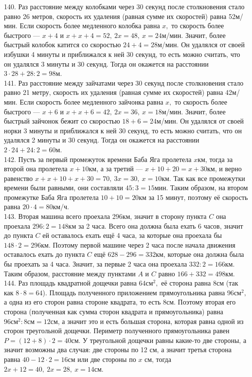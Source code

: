 \documentclass[12pt]{article}
\begin{document}
140. Раз расстояние между колобками через 30 секунд после столкновения стало равно 26 метров, скорость их удаления (равная сумме их скоростей) равна 52м/мин. Если скорость более медленного колобка равна $x,$ то скорость более быстрого --- $x+4$ и $x+x+4=52,\ 2x=48,\ x=24$м/мин. Значит, более быстрый колобок катится со скоростью $24+4=28$м/мин. Он удалялся от своей избушки 4 минуты и приближался к ней 30 секунд, то есть можно считать, что он удалялся 3 минуты и 30 секунд. Тогда он окажется на расстоянии $3\cdot28+28:2=98$м.\\
141. Раз расстояние между зайчатами через 30 секунд после столкновения стало равно 21 метру, скорость их удаления (равная сумме их скоростей) равна 42м/мин. Если скорость более медленного зайчонка равна $x,$ то скорость более быстрого --- $x+6$ и $x+x+6=42,\ 2x=36,\ x=18$м/мин. Значит, более быстрый зайчонок бежит со скоростью $18+6=24$м/мин. Он удалялся от своей норки 3 минуты и приближался к ней 30 секунд, то есть можно считать, что он удалялся 2 минуты и 30 секунд. Тогда он окажется на расстоянии $2\cdot24+24:2=60$м.\\
142. Пусть за первый промежуток времени Баба Яга пролетела $x$км, тогда за второй она пролетела $x+10$км, а за третий --- $x+10+20=x+30$км, и верно равенство $x+x+10+x+30=70,\ 3x=30,\ x=10$км. Так как все промежутки времени были равными, они составляли $45:3=15$мин. Таким образом, на втором промежутке Баба Яга пролетела $10+10=20$км за 15 минут, поэтому её скорость равна $20\cdot4=80$км/ч.\\
143. Вторая машина всего проехала 296км, значит в сторону пункта $C$ она проехала $296:2=148$км за 2 часа. Всего она должна была ехать 6 часов, значит до пункта $C$ ей оставалось ехать ещё 4 часа, за которые она проехала бы $148\cdot2=296$км. Поэтому первой машине через 2 часа после начала движения оставалось ехать до пункта $C$ ещё $628-296=332$км, которые она должна была бы проехать за 4 часа. Значит, за первые 2 часа она проехала $332:2=166$км. Таким образом, расстояние между пунктами $A$ и $C$ равно $166+332=498$км.\\
144. Раз площадь квадратной дощечки равна $64\text{см}^2,$ её сторона равна 8см (так как $8\cdot8=64$). Площадь полученного приложением прямоугольника равна $96\text{см}^2,$ а одна из его сторон равна стороне квадрата, то есть 8см. Поэтому вторая его сторона (полученная как сумма сторон квадрата и прямоугольника) равна $96\text{см}^2:8\text{см}=12$см, а значит это и есть большая сторона, которая равна одной из сторон треугольной дощечки. Периметр полученного прямоугольника равен $P=(12+8)\cdot2=40$см. У треугольной дощечки равны какие-то две стороны, а значит возможны два случая: две стороны по 12 см, а значит третья сторона равна $40-12\cdot2=16$см или две стороны по $x$ см, тогда $2x+12=40,\ 2x=28,\ x=14$см.\\
\end{document}
